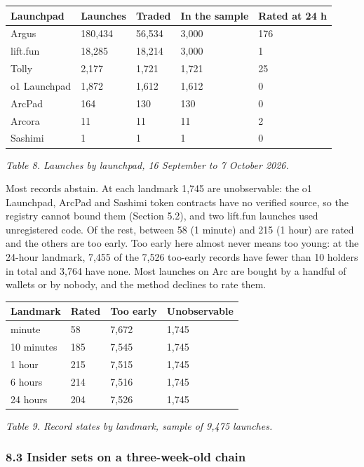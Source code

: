 {\def\LTcaptype{none} %
\begin{longtable}[]{@{}lllll@{}}
\toprule\noalign{}
Launchpad & Launches & Traded & In the sample & Rated at 24 h \\
\midrule\noalign{}
\endhead
\bottomrule\noalign{}
\endlastfoot
Argus & 180,434 & 56,534 & 3,000 & 176 \\
lift.fun & 18,285 & 18,214 & 3,000 & 1 \\
Tolly & 2,177 & 1,721 & 1,721 & 25 \\
o1 Launchpad & 1,872 & 1,612 & 1,612 & 0 \\
ArcPad & 164 & 130 & 130 & 0 \\
Arcora & 11 & 11 & 11 & 2 \\
Sashimi & 1 & 1 & 1 & 0 \\
\end{longtable}
}

\emph{Table 8. Launches by launchpad, 16 September to 7 October 2026.}

Most records abstain. At each landmark 1,745 are unobservable: the o1 Launchpad, ArcPad and Sashimi token contracts have no verified source, so the registry cannot bound them (Section 5.2), and two lift.fun launches used unregistered code. Of the rest, between 58 (1 minute) and 215 (1 hour) are rated and the others are too early. Too early here almost never means too young: at the 24-hour landmark, 7,455 of the 7,526 too-early records have fewer than 10 holders in total and 3,764 have none. Most launches on Arc are bought by a handful of wallets or by nobody, and the method declines to rate them.

{\def\LTcaptype{none} %
\begin{longtable}[]{@{}llll@{}}
\toprule\noalign{}
Landmark & Rated & Too early & Unobservable \\
\midrule\noalign{}
\endhead
\bottomrule\noalign{}
\endlastfoot
1 minute & 58 & 7,672 & 1,745 \\
10 minutes & 185 & 7,545 & 1,745 \\
1 hour & 215 & 7,515 & 1,745 \\
6 hours & 214 & 7,516 & 1,745 \\
24 hours & 204 & 7,526 & 1,745 \\
\end{longtable}
}

\emph{Table 9. Record states by landmark, sample of 9,475 launches.}

\subsubsection{8.3 Insider sets on a three-week-old chain}\label{insider-sets-on-a-three-week-old-chain}

